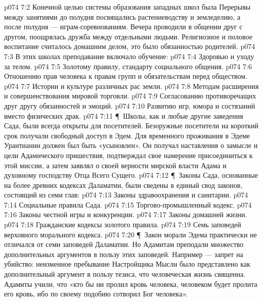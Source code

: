 \vs p074 7:2 Конечной целью системы образования западных школ была  Перерывы между занятиями до полудня посвящались растениеводству и земледелию, а после полудня --- играм\hyp{}соревнованиям. Вечера проводили в общении друг с другом, поощрялась дружба между отдельными людьми. Религиозное и половое воспитание считалось домашним делом, это было обязанностью родителей.
\vs p074 7:3 В этих школах преподавание включало обучение:
\vs p074 7:4 \bibnobreakspace Здоровью и уходу за телом.
\vs p074 7:5 \bibnobreakspace Золотому правилу, стандарту социального общения.
\vs p074 7:6 \bibnobreakspace Отношению прав человека к правам групп и обязательствам перед обществом.
\vs p074 7:7 \bibnobreakspace Истории и культуре различных рас земли.
\vs p074 7:8 \bibnobreakspace Методам расширения и совершенствования мировой торговли.
\vs p074 7:9 \bibnobreakspace Согласованию противоречащих друг другу обязанностей и эмоций.
\vs p074 7:10 \bibnobreakspace Развитию игр, юмора и состязаний вместо физических драк.
\vs p074 7:11 \P\ Школы, как и любые другие заведения Сада, были всегда открыты для посетителей. Безоружные посетители на короткий срок получали свободный доступ в Эдем. Для временного проживания в Эдеме Урантианин должен был быть «усыновлен». Он получал наставления о замысле и цели Адамического пришествия, подтверждал свое намерение присоединиться к этой миссии, а затем заявлял о своей верности мирской власти Адама и духовному господству Отца Всего Сущего.
\vs p074 7:12 \P\ Законы Сада, основанные на более древних кодексах Даламатии, были сведены в единый свод законов, состоящий из семи глав:
\vs p074 7:13 \bibnobreakspace Законы здравоохранения и санитарии.
\vs p074 7:14 \bibnobreakspace Социальные правила Сада.
\vs p074 7:15 \bibnobreakspace Торгово\hyp{}промышленный кодекс.
\vs p074 7:16 \bibnobreakspace Законы честной игры и конкуренции.
\vs p074 7:17 \bibnobreakspace Законы домашней жизни.
\vs p074 7:18 \bibnobreakspace Гражданские кодексы золотого правила.
\vs p074 7:19 \bibnobreakspace Семь заповедей верховного морального кодекса.
\vs p074 7:20 \P\ Закон морали Эдема практически не отличался от семи заповедей Даламатии. Но Адамитам преподали множество дополнительных аргументов в пользу этих заповедей. Например --- запрет на убийство: неизменное пребывание Настройщика Мысли было представлено как дополнительный аргумент в пользу тезиса, что человеческая жизнь священна. Адамиты учили, что «кто бы ни пролил кровь человека, человеком будет пролита его кровь, ибо по своему подобию сотворил Бог человека».
